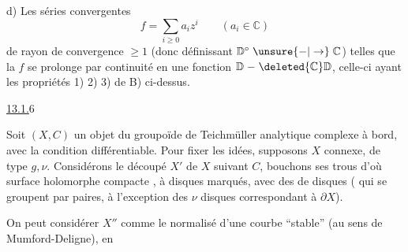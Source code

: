 d) Les séries convergentes
\[
f=\sum_{i\geq0}a_i z^i\qquad(a_i\in\mathbb C)
\]
de rayon de convergence $\geq1$ (donc
définissant $\mathbb D^\circ\mathrel{\unsure{-|\to}}\mathbb C$)  telles que la $f$
se prolonge par continuité en une
fonction $\mathbb D\mathrel{-}\deleted{\mathbb C}\mathbb D$, celle-ci ayant les
propriétés 1) 2) 3) de B) ci-dessus.

\uline{13.1.}\qquad\textcircled{6}

Soit $(X,C)$ un objet du groupoïde
de Teichmüller analytique complexe
à bord, avec la condition différentiable.
Pour fixer les idées, supposons $X$ connexe,
de type $g,\nu$. Considérons le découpé $X'$
de $X$ suivant $C$, bouchons ses trous 
d'où surface holomorphe compacte , à disques
 marqués, avec des   de   disques
( qui se groupent par paires, à l'exception
des $\nu$ disques correspondant à $\partial X$).

On peut considérer $X''$ comme le
normalisé d'une courbe   ``stable''
(au sens de Mumford-Deligne), en
